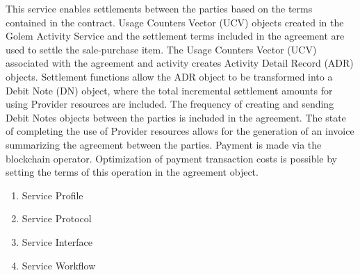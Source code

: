 This service enables settlements between the parties based on the terms contained in the contract. 
Usage Counters Vector (UCV) objects created in the Golem Activity Service and the settlement terms included in the agreement 
are used to settle the sale-purchase item. The Usage Counters Vector (UCV) associated with the agreement and activity creates 
Activity Detail Record (ADR) objects. Settlement functions allow the ADR object to be transformed into a Debit Note (DN) object, 
where the total incremental settlement amounts for using Provider resources are included. The frequency of creating and sending 
Debit Notes objects between the parties is included in the agreement. The state of completing the use of Provider resources allows 
for the generation of an invoice summarizing the agreement between the parties. 
Payment is made via the blockchain operator. Optimization of payment transaction costs is possible by setting the terms of this operation 
in the agreement object.


\begin{enumerate}
    \item Service Profile
    \item Service Protocol
    \item Service Interface
    \item Service Workflow
\end{enumerate}









